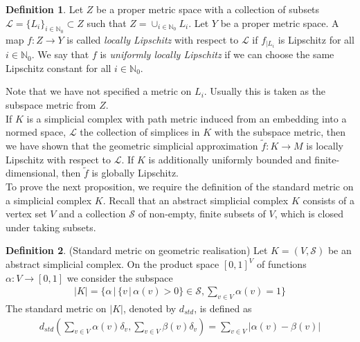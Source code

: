 \documentclass[a4paper,11pt]{article}
\theoremstyle{definition}
\newtheorem{definition}{Definition}[section]
\theoremstyle{plain}
\theoremstyle{remark}
\begin{document}
{\begin{definition} \label{uniformll} Let $Z$ be a proper metric space with a collection of subsets $\mathcal{L}=\{L_{i}\}_{i\in \mathbb{N}_{0}} \subset Z$ such that $Z= \cup_{i\in \mathbb{N}_{0}} L_{i}$. Let $Y$ be a proper metric space. A map $f: Z\rightarrow Y$ is called \textit{locally Lipschitz} with respect to $\mathcal{L}$ if $f_{|L_{i}}$ is Lipschitz for all $i\in \mathbb{N}_{0}$. We say that $f$ is \textit{uniformly locally Lipschitz} if we can choose the same Lipschitz constant for all $i\in \mathbb{N}_{0}$.
\end{definition}

Note that we have not specified a metric on $L_{i}$. Usually this is taken as the subspace metric from $Z$.  \\

If $K$ is a simplicial complex with path metric induced from an embedding into a normed space, $\mathcal{L}$ the collection of simplices in $K$ with the subspace metric, then we have shown that the geometric simplicial approximation $\tilde{f}: K\rightarrow M$ is locally Lipschitz with respect to $\mathcal{L}$. If $K$ is additionally uniformly bounded and finite-dimensional, then $\tilde{f}$ is globally Lipschitz. \\

To prove the next proposition, we require the definition of the standard metric on a simplicial complex $K$. Recall that an abstract simplicial complex $K$ consists of a vertex set $V$ and a collection $\mathcal{S}$ of non-empty, finite subsets of $V$, which is closed under taking subsets. 


\begin{definition} \label{metstd}(Standard metric on geometric realisation) Let $K= (V,\mathcal{S})$ be an abstract simplicial complex. On the product space $[0,1]^V$ of functions $\alpha: V\rightarrow [0,1]$ we consider the subspace
\begin{align*}
|K| = \{\alpha\,|\, \{v\,|\,\alpha(v)>0\} \in \mathcal{S}, \sum_{v\in V} \alpha(v) = 1\}
\end{align*}
The standard metric on $|K|$, denoted by $d_{std}$, is defined as 
\begin{align*}
d_{std}(\sum_{v\in V}\alpha(v)\delta_v,\sum_{v\in V}\beta(v) \delta_v) = \sum_{v \in V} |\alpha(v)-\beta(v)|
\end{align*}
\end{definition}

}
\end{document}
